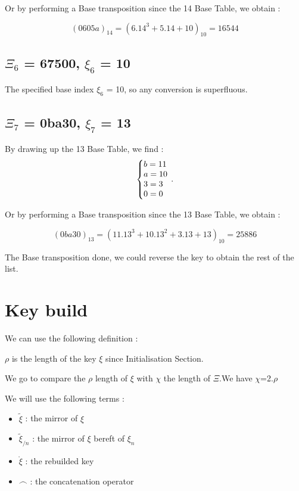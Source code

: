 \documentclass{article}
\begin{document}
\begin{flushleft}
	Or by performing a Base transposition since the 14 Base Table, we obtain :
\end{flushleft}
\begin{equation}
(0605a)_{14}=(6.14^{3}+5.14+10)_{10}=16544
\end{equation}

\subsection{$\Xi_{6}$ = 67500, $\xi_{6}$ = 10}
The specified base index $\xi_{6}$ = 10, so any conversion is superfluous.


\subsection{$\Xi_{7}$ = 0ba30, $\xi_{7}$ = 13}
By drawing up the 13 Base Table, we find :
\begin{equation}
\centering
\left\{\begin{array}{@{}l@{}}
b=11 \\
a=10 \\
3=3 \\
0=0 \\
\end{array}\right.\,.
\end{equation}

\begin{flushleft}
	Or by performing a Base transposition since the 13 Base Table, we obtain :
\end{flushleft}
\begin{equation}
(0ba30)_{13}=(11.13^{3}+10.13^{2}+3.13+13)_{10}=25886
\end{equation}

The Base transposition done, we could reverse the key to obtain the rest of the list.
\section*{Key build}
\begin{flushleft}
We can use the following definition :

$\rho$ is the length of the key $\xi$ since Initialisation Section.

We go to compare the $\rho$ length of $\xi$ with $\chi$ the length of $\Xi$.We have $\chi$=2.$\rho$

We will use the following terms : 

\begin{itemize}
	\item $\tilde{\xi}$ : the mirror of $\xi$
	
	\item $\tilde{\xi}_{/n}$ : the mirror of $\xi$ bereft of $\xi_{n}$
	
	\item $\mathring{\xi}$ : the rebuilded key	
	
	\item $\frown$ : the concatenation operator
\end{itemize}
\end{flushleft}
\end{document}
